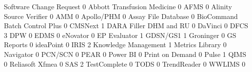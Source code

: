 \documentclass{article}
\begin{document}
\begin{Schunk}
\begin{Soutput}
                                Software Change Request
                                                      0
  Abbott Transfusion Medicine                         0
  AFMS                                                0
  Alinity Source Verifier                             0
  AMM                                                 0
  Apollo/PHM                                          0
  Assay File Database                                 0
  BioCommand Batch Control Plus                       0
  CMSNext                                             1
  DARA Filler DHM and RU                              0
  DaVinci                                             0
  DFCS                                                3
  DPW                                                 0
  EDMS                                                0
  eNovator                                            0
  EP Evaluator                                        1
  GDSN/GS1                                            1
  Groninger                                           0
  GS Reports                                          0
  ideaPoint                                           0
  IRIS                                                2
  Knowledge Management                                1
  Metrics Library                                     0
  Navigator                                           0
  PCN/SCN                                             0
  PEAR                                                0
  Power BI                                            0
  Print on Demand                                     0
  Pulse                                               1
  QIMS                                                0
  Reliasoft Xfmea                                     0
  SAS                                                 2
  TestComplete                                        0
  TODS                                                0
  TrendReader                                         0
  WWLIMS                                              0
                               

\end{Soutput}
\end{Schunk}
\end{document}
